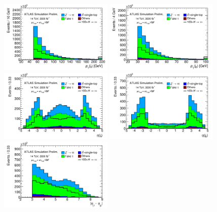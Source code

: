 \begin{figure}[!htpb]
  \centering
  \includegraphics[width=0.48\textwidth]{figures/ATL-PHYS-PUB-2014-018/fig_03a}
  \includegraphics[width=0.48\textwidth]{figures/ATL-PHYS-PUB-2014-018/fig_03b}
  \includegraphics[width=0.48\textwidth]{figures/ATL-PHYS-PUB-2014-018/fig_03c}
  \includegraphics[width=0.48\textwidth]{figures/ATL-PHYS-PUB-2014-018/fig_03d}
  \includegraphics[width=0.48\textwidth]{figures/ATL-PHYS-PUB-2014-018/fig_03e}

\end{figure}
